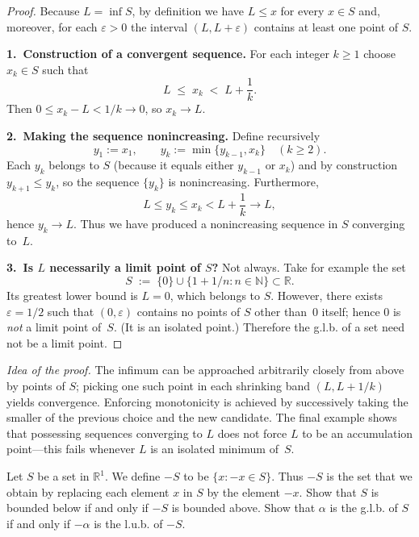 \documentclass[10pt]{extarticle}
\begin{document}
\begin{proof}
    Because $L=\inf S$, by definition we have $L\le x$ for every $x\in S$ and, moreover, for each $\varepsilon>0$ the interval $(L, L+\varepsilon)$ contains at least one point of $S$.

    \medskip
    \textbf{1.~Construction of a convergent sequence.}  For each integer $k\ge1$ choose $x_{k}\in S$ such that
    \[
        L\;\le\;x_{k}\;<\;L+\frac{1}{k}.
    \]
    Then $0\le x_{k}-L<1/k\to0$, so $x_{k}\to L$.

    \medskip
    \textbf{2.~Making the sequence nonincreasing.}  Define recursively
    \[
        y_{1}:=x_{1},\qquad y_{k}:=\min\{y_{k-1},x_{k}\}\quad(k\ge2).
    \]
    Each $y_{k}$ belongs to $S$ (because it equals either $y_{k-1}$ or $x_{k}$) and by construction $y_{k+1}\le y_{k}$, so the sequence $\{y_{k}\}$ is nonincreasing.  Furthermore,
    \[
        L\le y_{k}\le x_{k}<L+\frac{1}{k}\longrightarrow L,
    \]
    hence $y_{k}\to L$.  Thus we have produced a nonincreasing sequence in $S$ converging to~$L$.

    \medskip
    \textbf{3.~Is $L$ necessarily a limit point of $S$?}  Not always.  Take for example the set
    \[
        S\;:=\;\{0\}\cup\bigl\{1+1/n:n\in\mathbb N\bigr\}\subset\mathbb R.
    \]
    Its greatest lower bound is $L=0$, which belongs to $S$.  However, there exists $\varepsilon=1/2$ such that $(0,\varepsilon)$ contains no points of $S$ other than~$0$ itself; hence $0$ is \emph{not} a limit point of~$S$.  (It is an isolated point.)  Therefore the g.l.b.
    of a set need not be a limit point.
\end{proof}

\begin{remark}
    \emph{Idea of the proof.}  The infimum can be approached arbitrarily closely from above by points of $S$; picking one such point in each shrinking band $(L, L+1/k)$ yields convergence.  Enforcing monotonicity is achieved by successively taking the smaller of the previous choice and the new candidate.  The final example shows that possessing sequences converging to $L$ does not force $L$ to be an accumulation point—this fails whenever $L$ is an isolated minimum of~$S$.
\end{remark}

\begin{exercise}[6.2]
    Let $S$ be a set in $\mathbb{R} ^1$. We define $-S$ to be $\{x:-x \in S\}$. Thus $-S$ is the set that we obtain by replacing each element $x$ in $S$ by the element $-x$. Show that $S$ is bounded below if and only if $-S$ is bounded above. Show that $\alpha$ is the g.l.b. of $S$ if and only if $-\alpha$ is the l.u.b. of $-S$.
\end{exercise}
\end{document}
